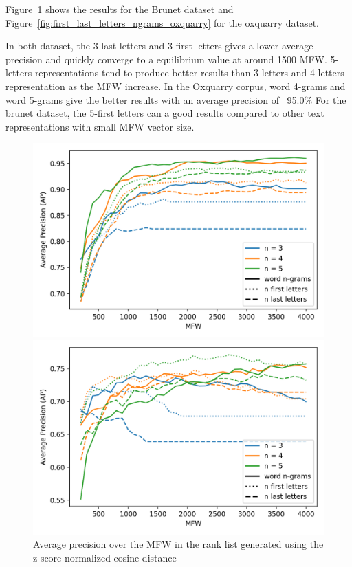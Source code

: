 Figure~\ref{fig:first_last_letters_ngrams_brunet} shows the results for the Brunet dataset and Figure~\ref{fig:first_last_letters_ngrams_oxquarry} for the oxquarry dataset.

In both dataset, the 3-last letters and 3-first letters gives a lower average precision and quickly converge to a equilibrium value at around 1500 MFW.
5-letters representations tend to produce better results than 3-letters and 4-letters representation as the MFW increase.
In the Oxquarry corpus, word 4-grams and word 5-grams give the better results with an average precision of ~95.0\%
For the brunet dataset, the 5-first letters can a good results compared to other text representations with small MFW vector size.

\begin{figure}
  \centering
  \caption{Average precision over the MFW in the rank list generated using the z-score normalized cosine distance}

  \label{fig:first_last_letters_ngrams_oxquarry}
  \includegraphics[width=\linewidth]{img/first_last_letters_ngrams_oxquarry.png}

  \label{fig:first_last_letters_ngrams_brunet}
  \includegraphics[width=\linewidth]{img/first_last_letters_ngrams_brunet.png}
\end{figure}

